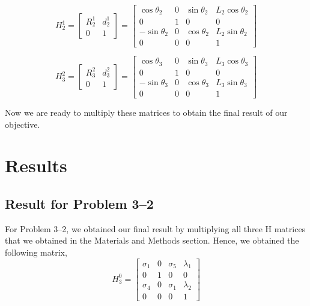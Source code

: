 \documentclass[conference]{IEEEtran}
\begin{document}
\[
    H^1_2 = \begin{bmatrix}
        R^1_2 & d^1_2\\
        0 & 1
    \end{bmatrix}
    =
    \begin{bmatrix}
        \cos\theta _{2} & 0 & \sin\theta _{2} & L_{2} \cos\theta_2\\
        0 & 1 & 0 & 0\\
        -\sin\theta _{2} & 0 & \cos\theta_{2} & L_2 \sin\theta_2\\
        0 & 0 & 0 & 1
    \end{bmatrix}
\]

\[
    H^2_3 = \begin{bmatrix}
        R^2_3 & d^2_3\\
        0 & 1
    \end{bmatrix}
    =
    \begin{bmatrix}
        \cos\theta _{3} & 0 & \sin\theta _{3} & L_{3} \cos\theta_3\\
        0 & 1 & 0 & 0\\
        -\sin\theta _{3} & 0 & \cos\theta_{3} & L_3 \sin\theta_3\\
        0 & 0 & 0 & 1
    \end{bmatrix}
\]

Now we are ready to multiply these matrices to obtain the final result
of our objective.

\section{Results}

\subsection{Result for Problem 3--2}

For Problem 3--2, we obtained our final result by multiplying all three H matrices
that we obtained in the Materials and Methods section. Hence, we obtained the following
matrix,
\[
    H^0_3 =
    \begin{bmatrix}
    \sigma_1  & 0 & \sigma_5  & \lambda_1 \\
    0 & 1 & 0 & 0\\
    \sigma_4 & 0 & \sigma_1  & \lambda_2 \\
    0 & 0 & 0 & 1
    \end{bmatrix}
\]
\end{document}
